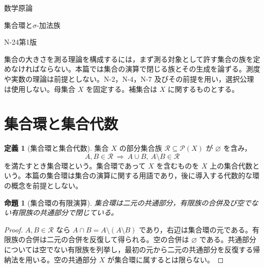\documentclass[a5paper,10pt,dvipdfmx]{jsarticle}
\theoremstyle{definition}
\newtheorem{defn}[ruledef]{定義}
\theoremstyle{plain}
\newtheorem{prop}[ruledef]{命題}
\newcommand{\Pow}{\mathcal{P}}
\begin{document}
\begin{center}
{\small 数学原論}\par\vspace{4mm}
{\LARGE 集合環と$\sigma$-加法族}\par\vspace{2mm}
{\small N-24\quad 第1版}
\end{center}
集合の大きさを測る理論を構成するには，まず測る対象として許す集合の族を定めなければならない。本篇では集合の演算で閉じる族とその生成を論ずる。測度や実数の理論は前提としない。N-2，N-4，N-7 及びその前提を用い，選択公理は使用しない。母集合 $X$ を固定する。補集合は $X$ に関するものとする。
\section{集合環と集合代数}
\begin{defn}[集合環と集合代数]\label{k178}
集合 $X$ の部分集合族 $\mathcal R\subseteq\Pow(X)$ が $\varnothing$ を含み，
\[ A,B\in\mathcal R\ \Longrightarrow\ A\cup B,\ A\setminus B\in\mathcal R \]
を満たすとき集合環という。集合環であって $X$ を含むものを $X$ 上の集合代数という。本篇の集合環は集合の演算に関する用語であり，後に導入する代数的な環の概念を前提としない。
\end{defn}
\begin{prop}[集合環の有限演算]\label{k179}
集合環は二元の共通部分，有限族の合併及び空でない有限族の共通部分で閉じている。
\end{prop}
\begin{proof}
$A,B\in\mathcal R$ なら $A\cap B=A\setminus(A\setminus B)$ であり，右辺は集合環の元である。有限族の合併は二元の合併を反復して得られる。空の合併は $\varnothing$ である。共通部分については空でない有限族を列挙し，最初の元から二元の共通部分を反復する帰納法を用いる。空の共通部分 $X$ が集合環に属するとは限らない。
\end{proof}
\end{document}
